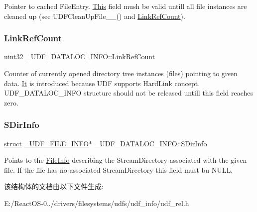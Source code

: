 Pointer to cached File\+Entry. \hyperlink{namespace_this}{This} field mush be valid untill all file instances are cleaned up (see U\+D\+F\+Clean\+Up\+File\+\_\+\+\_\+() and \hyperlink{struct___u_d_f___d_a_t_a_l_o_c___i_n_f_o_ac573bac9d1c567842bbb5c68798927fb}{Link\+Ref\+Count}). \mbox{\label{struct___u_d_f___d_a_t_a_l_o_c___i_n_f_o_ac573bac9d1c567842bbb5c68798927fb}} 
\subsubsection{\texorpdfstring{Link\+Ref\+Count}{LinkRefCount}}
{\footnotesize\ttfamily uint32 \+\_\+\+U\+D\+F\+\_\+\+D\+A\+T\+A\+L\+O\+C\+\_\+\+I\+N\+F\+O\+::\+Link\+Ref\+Count}

Counter of currently opened directory tree instances (files) pointing to given data. \hyperlink{class_it}{It} is introduced because U\+DF supports Hard\+Link concept. U\+D\+F\+\_\+\+D\+A\+T\+A\+L\+O\+C\+\_\+\+I\+N\+FO structure should not be released untill this field reaches zero. \mbox{\label{struct___u_d_f___d_a_t_a_l_o_c___i_n_f_o_a1c3f0b9df859980637a14f92d08350d4}} 
\subsubsection{\texorpdfstring{S\+Dir\+Info}{SDirInfo}}
{\footnotesize\ttfamily \hyperlink{interfacestruct}{struct} \hyperlink{struct___u_d_f___f_i_l_e___i_n_f_o}{\+\_\+\+U\+D\+F\+\_\+\+F\+I\+L\+E\+\_\+\+I\+N\+FO}$\ast$ \+\_\+\+U\+D\+F\+\_\+\+D\+A\+T\+A\+L\+O\+C\+\_\+\+I\+N\+F\+O\+::\+S\+Dir\+Info}

Points to the \hyperlink{struct_file_info}{File\+Info} describing the Stream\+Directory associated with the given file. If the file has no associated Stream\+Directory this field must bu N\+U\+LL. 

该结构体的文档由以下文件生成\+:\begin{DoxyCompactItemize}
\item 
E\+:/\+React\+O\+S-\/0../drivers/filesystems/udfs/udf\+\_\+info/udf\+\_\+rel.\+h\end{DoxyCompactItemize}
